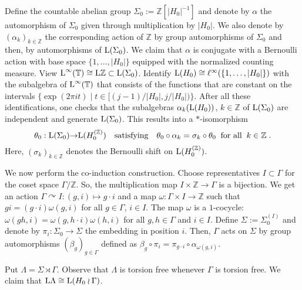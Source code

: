 \documentclass[a4paper,11pt]{amsart}
\numberwithin{equation}{section}
\begin{document}
Define the countable abelian group $\Sigma_0 := {\mathbb{Z}}[|H_0|^{-1}]$ and denote by ${\alpha}$ the automorphism of $\Sigma_0$ given through multiplication by $|H_0|$. We also denote by $({\alpha}_k)_{k \in {\mathbb{Z}}}$ the corresponding action of ${\mathbb{Z}}$ by group automorphisms of $\Sigma_0$ and then, by automorphisms of ${\mathord{\text{\rm L}}}(\Sigma_0)$. We claim that ${\alpha}$ is conjugate with a Bernoulli action with base space $\{1,\ldots,|H_0|\}$ equipped with the normalized counting measure. View ${\mathord{\text{\rm L}}}^\infty({\mathbb{T}}) \cong {\mathord{\text{\rm L}}} {\mathbb{Z}} \subset {\mathord{\text{\rm L}}}(\Sigma_0)$. Identify ${\mathord{\text{\rm L}}}(H_0) \cong \ell^\infty(\{1,\ldots,|H_0|\})$ with the subalgebra of ${\mathord{\text{\rm L}}}^\infty({\mathbb{T}})$ that consists of the functions that are constant on the intervals $\{\exp(2 \pi i t) \mid t \in [(j-1)/|H_0|,j/|H_0|) \}$. After all these identifications, one checks that the subalgebras ${\alpha}_k({\mathord{\text{\rm L}}}(H_0))$, $k \in {\mathbb{Z}}$ of ${\mathord{\text{\rm L}}}(\Sigma_0)$ are independent and generate ${\mathord{\text{\rm L}}}(\Sigma_0)$. This results into a $*$-isomorphism
$$\theta_0 : {\mathord{\text{\rm L}}}(\Sigma_0) {\rightarrow} {\mathord{\text{\rm L}}}(H_0^{({\mathbb{Z}})}) \quad\text{satisfying}\quad \theta_0 \circ {\alpha}_k = {\sigma}_k \circ \theta_0 \;\;\text{for all}\;\; k \in {\mathbb{Z}} \; .$$
Here, $({\sigma}_k)_{k \in {\mathbb{Z}}}$ denotes the Bernoulli shift on ${\mathord{\text{\rm L}}}(H_0^{({\mathbb{Z}})})$.

We now perform the co-induction construction. Choose representatives $I \subset \Gamma$ for the coset space $\Gamma / {\mathbb{Z}}$. So, the multiplication map $I \times {\mathbb{Z}} {\rightarrow} \Gamma$ is a bijection. We get an action $\Gamma {\curvearrowright} I : (g,i) \mapsto g \cdot i$ and a map ${\omega} : \Gamma \times I {\rightarrow} {\mathbb{Z}}$ such that $g i = (g\cdot i) {\omega}(g,i)$ for all $g \in \Gamma$, $i \in I$. The map ${\omega}$ is a $1$-cocycle: ${\omega}(gh,i) = {\omega}(g,h\cdot i) {\omega}(h,i)$ for all $g,h \in \Gamma$ and $i \in I$. Define $\Sigma := \Sigma_0^{(I)}$ and denote by $\pi_i : \Sigma_0 {\rightarrow} \Sigma$ the embedding in position $i$. Then, $\Gamma$ acts on $\Sigma$ by group automorphisms $(\beta_g)_{g \in \Gamma}$ defined as $\beta_g \circ \pi_i = \pi_{g \cdot i} \circ {\alpha}_{{\omega}(g,i)}$.

Put $\Lambda = \Sigma \rtimes \Gamma$. Observe that $\Lambda$ is torsion free whenever $\Gamma$ is torsion free. We claim that ${\mathord{\text{\rm L}}} \Lambda \cong {\mathord{\text{\rm L}}}(H_0 \wr \Gamma)$.
\end{document}
